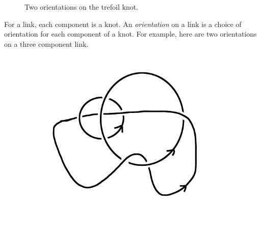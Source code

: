 \documentclass[12pt,letterpaper]{article}
\theoremstyle{definition}
\begin{document}
\begin{figure}[h]
\begin{subfigure}{.3\textwidth}
    \end{subfigure}
    \caption{Two orientations on the trefoil knot.}
\end{figure}

For a link, each component is a knot. 
An \emph{orientation} on a link is a choice of orientation for each component of a knot.
For example, here are two orientations on a three component link.

\begin{figure}[h]
    \centering
    \begin{subfigure}{.3\textwidth}
        \centering
        \includegraphics[width=\textwidth]{rgp11pics/threelinka.png}
    \end{subfigure}
    \hspace{1cm}
    \begin{subfigure}{.3\textwidth}
        \centering         

\end{subfigure}
\end{figure}
\end{document}
